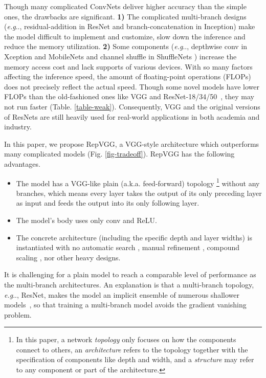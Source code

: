 \documentclass[final]{cvpr}
\makeatletter
\DeclareRobustCommand\onedot{\futurelet\@let@token\@onedot}
\def\@onedot{\ifx\@let@token.\else.\null\fi\xspace}
\def\eg{\emph{e.g}\onedot}
\makeatother
\begin{document}
Though many complicated ConvNets deliver higher accuracy than the simple ones, the drawbacks are significant. \textbf{1)} The complicated multi-branch designs (\eg, residual-addition in ResNet and branch-concatenation in Inception) make the model difficult to implement and customize, slow down the inference and reduce the memory utilization. \textbf{2)} Some components (\eg, depthwise conv in Xception \cite{chollet2017xception} and MobileNets \cite{mbv1,mbv2} and channel shuffle in ShuffleNets \cite{ma2018shufflenet,zhang2018shufflenet}) increase the memory access cost and lack supports of various devices. With so many factors affecting the inference speed, the amount of floating-point operations (FLOPs) does not precisely reflect the actual speed. Though some novel models have lower FLOPs than the old-fashioned ones like VGG and ResNet-18/34/50~\cite{he2016deep}, they may not run faster (Table. \ref{table-weak}). Consequently, VGG and the original versions of ResNets are still heavily used for real-world applications in both academia and industry.


In this paper, we propose RepVGG, a VGG-style architecture which outperforms many complicated models (Fig. \ref{fig-tradeoff}). RepVGG has the following advantages.
\begin{itemize}[noitemsep,nolistsep,topsep=0pt,parsep=0pt,partopsep=0pt]
	\item The model has a VGG-like plain (a.k.a. feed-forward) topology \footnote{In this paper, a network \textit{topology} only focuses on how the components connect to others, an \textit{architecture} refers to the topology together with the specification of components like depth and width, and a \textit{structure} may refer to any component or part of the architecture.} without any branches, which means every layer takes the output of its only preceding layer as input and feeds the output into its only following layer.
	\item The model's body uses only  conv and ReLU.
	\item The concrete architecture (including the specific depth and layer widths) is instantiated with no automatic search \cite{zoph2018learning}, manual refinement \cite{regnet}, compound scaling \cite{efficientnet}, nor other heavy designs.
\end{itemize}


It is challenging for a plain model to reach a comparable level of performance as the multi-branch architectures. An explanation is that a multi-branch topology, \eg, ResNet, makes the model an implicit ensemble of numerous shallower models~\cite{veit2016residual}, so that training a multi-branch model avoids the gradient vanishing problem. 
\end{document}
